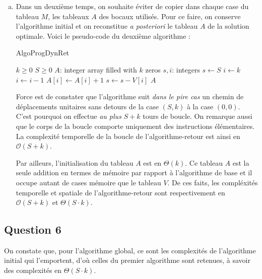 \documentclass[12pt,a4paper]{article}
\newcommand{\BigO}{\mathcal{O}}
\begin{document}
\begin{enumerate}[a)]
 \item Dans un deuxi\`eme temps, on souhaite \'eviter de copier dans chaque case du tableau $M$, les tableaux $A$ des bocaux utilis\'es. Pour ce faire, on conserve l'algorithme initial et on reconstitue {\itshape a posteriori} le tableau $A$ de la solution optimale. Voici le pseudo-code du deuxi\`eme algorithme :
 
 \clearpage
 \begin{algorithm}
\caption{AlgoProgDynRet}
\begin{algorithmic}[1]
\Require $k \geq 0$ \AND $S \geq 0$
    \State $A$: integer array filled with $k$ zeros
    \State $s, i$: integers
    \State $s \gets S$
    \State $i \gets k$
            \State $i \gets i-1$
        \Else
            \State $A[i] \gets A[i] + 1$
            \State $s \gets s - V[i]$
        \EndIf
    \EndWhile
    \State \Return $A$
\EndFunction
\end{algorithmic}
\end{algorithm}

 
 Force est de constater que l'algorithme suit {\itshape dans le pire cas} un chemin de d\'eplacements unitaires sans detours de la case $(S,k)$ \`a la case $(0,0)$. C'est pourquoi on effectue {\itshape au plus} $S+k$ tours de boucle. On remarque aussi que le corps de la boucle comporte uniquement des instructions \'el\'ementaires. La complexit\'e temporelle de la boucle de l'algorithme-retour est ainsi en $\BigO(S+k)$.
 
 Par ailleurs, l'initialisation du tableau $A$ est en $\Theta(k)$. Ce tableau $A$ est la seule addition en termes de m\'emoire par rapport \`a l'algorithme de base et il occupe autant de cases m\'emoire que le tableau $V$. 
 De ces faits, les compl\'exit\'es temporelle et spatiale de l'algorithme-retour sont respectivement en $\BigO(S+k)$ et $\Theta(S\cdot k)$.
 
\end{enumerate}

\subsection*{Question 6}
 On constate que, pour l'algorithme global, ce sont les complexit\'es de l'algorithme initial qui l'emportent, d'o\`u celles du premier algorithme sont retenues, \`a savoir des complexit\'es en $\Theta(S\cdot k)$.
 
\end{document}
